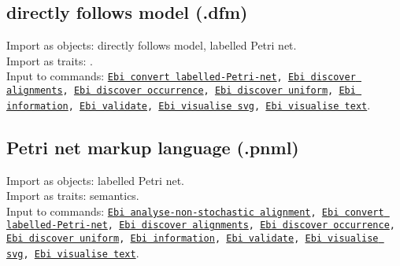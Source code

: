 {\subsection{directly follows model (.dfm)}
Import as objects: directly follows model, labelled Petri net.
\\Import as traits: .
\\Input to commands: \texttt{\hyperref[command:Ebi convert labelled-Petri-net]{Ebi convert labelled-Petri-net}, \hyperref[command:Ebi discover alignments]{Ebi discover alignments}, \hyperref[command:Ebi discover occurrence]{Ebi discover occurrence}, \hyperref[command:Ebi discover uniform]{Ebi discover uniform}, \hyperref[command:Ebi information]{Ebi information}, \hyperref[command:Ebi validate]{Ebi validate}, \hyperref[command:Ebi visualise svg]{Ebi visualise svg}, \hyperref[command:Ebi visualise text]{Ebi visualise text}}.
\subsection{Petri net markup language (.pnml)}
Import as objects: labelled Petri net.
\\Import as traits: semantics.
\\Input to commands: \texttt{\hyperref[command:Ebi analyse-non-stochastic alignment]{Ebi analyse-non-stochastic alignment}, \hyperref[command:Ebi convert labelled-Petri-net]{Ebi convert labelled-Petri-net}, \hyperref[command:Ebi discover alignments]{Ebi discover alignments}, \hyperref[command:Ebi discover occurrence]{Ebi discover occurrence}, \hyperref[command:Ebi discover uniform]{Ebi discover uniform}, \hyperref[command:Ebi information]{Ebi information}, \hyperref[command:Ebi validate]{Ebi validate}, \hyperref[command:Ebi visualise svg]{Ebi visualise svg}, \hyperref[command:Ebi visualise text]{Ebi visualise text}}.
}
\def\ebifilehandlerlist{\begin{itemize}
\item alignments (.ali)
\item finite language (.lang)
\item labelled Petri net (.lpn)
\item stochastic labelled Petri net (.slpn)
\item finite stochastic language (.slang)
\item stochastic deterministic finite automaton (.sdfa)
\item event log (.xes)
\item compressed event log (.xes.gz)
\item directly follows model (.dfm)
\item Petri net markup language (.pnml)
\end{itemize}}
